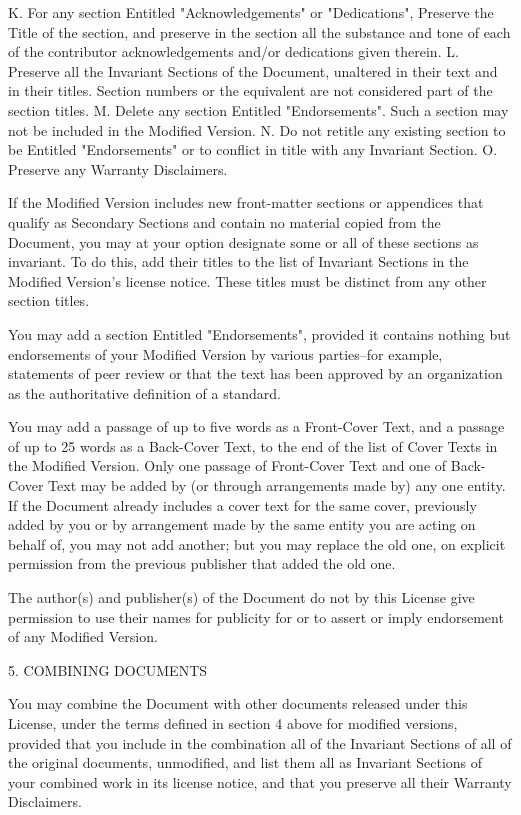 \documentclass[oneside,english,a4paper,10pt,oneside,openany,final]{memoir}
\begin{document}
    K. For any section Entitled "Acknowledgements" or "Dedications", Preserve the Title of the section, and preserve in the section all the substance and tone of each of the contributor acknowledgements and/or dedications given therein.
    L. Preserve all the Invariant Sections of the Document, unaltered in their text and in their titles. Section numbers or the equivalent are not considered part of the section titles.
    M. Delete any section Entitled "Endorsements". Such a section may not be included in the Modified Version.
    N. Do not retitle any existing section to be Entitled "Endorsements" or to conflict in title with any Invariant Section.
    O. Preserve any Warranty Disclaimers.

If the Modified Version includes new front-matter sections or appendices that qualify as Secondary Sections and contain no material copied from the Document, you may at your option designate some or all of these sections as invariant. To do this, add their titles to the list of Invariant Sections in the Modified Version's license notice. These titles must be distinct from any other section titles.

You may add a section Entitled "Endorsements", provided it contains nothing but endorsements of your Modified Version by various parties--for example, statements of peer review or that the text has been approved by an organization as the authoritative definition of a standard.

You may add a passage of up to five words as a Front-Cover Text, and a passage of up to 25 words as a Back-Cover Text, to the end of the list of Cover Texts in the Modified Version. Only one passage of Front-Cover Text and one of Back-Cover Text may be added by (or through arrangements made by) any one entity. If the Document already includes a cover text for the same cover, previously added by you or by arrangement made by the same entity you are acting on behalf of, you may not add another; but you may replace the old one, on explicit permission from the previous publisher that added the old one.

The author(s) and publisher(s) of the Document do not by this License give permission to use their names for publicity for or to assert or imply endorsement of any Modified Version.

5. COMBINING DOCUMENTS

You may combine the Document with other documents released under this License, under the terms defined in section 4 above for modified versions, provided that you include in the combination all of the Invariant Sections of all of the original documents, unmodified, and list them all as Invariant Sections of your combined work in its license notice, and that you preserve all their Warranty Disclaimers.
\end{document}

